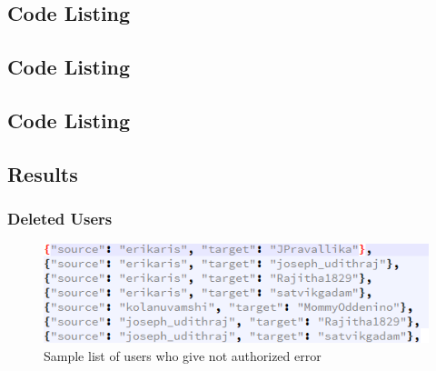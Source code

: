 \subsection{Code Listing}


\newpage

\subsection{Code Listing}


\newpage

\subsection{Code Listing}


\newpage

\subsection{Results}

\subsubsection{Deleted Users}
\begin{figure}[ht]    
    \begin{center}
        \includegraphics[scale=0.6]{sample_delete_users.png}
        \caption{Sample list of users who give not authorized error}
        \label{Sample_list1}
    \end{center}
\end{figure}

